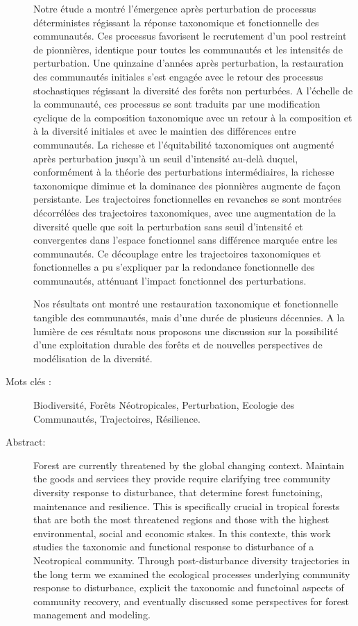 \documentclass[
  11pt,
  french,
  A4paper,
  extrafontsizes,onecolumn,openright
  ]{memoir}
\begin{document}
\begin{normalsize}
\begin{description}
Notre étude a montré l'émergence après perturbation de processus
déterministes régissant la réponse taxonomique et fonctionnelle des
communautés. Ces processus favorisent le recrutement d'un pool restreint
de pionnières, identique pour toutes les communautés et les intensités
de perturbation. Une quinzaine d'années après perturbation, la
restauration des communautés initiales s'est engagée avec le retour des
processus stochastiques régissant la diversité des forêts non
perturbées. A l'échelle de la communauté, ces processus se sont traduits
par une modification cyclique de la composition taxonomique avec un
retour à la composition et à la diversité initiales et avec le maintien
des différences entre communautés. La richesse et l'équitabilité
taxonomiques ont augmenté après perturbation jusqu'à un seuil
d'intensité au-delà duquel, conformément à la théorie des perturbations
intermédiaires, la richesse taxonomique diminue et la dominance des
pionnières augmente de façon persistante. Les trajectoires
fonctionnelles en revanches se sont montrées décorrélées des
trajectoires taxonomiques, avec une augmentation de la diversité quelle
que soit la perturbation sans seuil d'intensité et convergentes dans
l'espace fonctionnel sans différence marquée entre les communautés. Ce
découplage entre les trajectoires taxonomiques et fonctionnelles a pu
s'expliquer par la redondance fonctionnelle des communautés, atténuant
l'impact fonctionnel des perturbations.

Nos résultats ont montré une restauration taxonomique et fonctionnelle
tangible des communautés, mais d'une durée de plusieurs décennies. A la
lumière de ces résultats nous proposons une discussion sur la
possibilité d'une exploitation durable des forêts et de nouvelles
perspectives de modélisation de la diversité.\newline

\item[Mots clés :]
Biodiversité, Forêts Néotropicales, Perturbation, Ecologie des Communautés, Trajectoires, Résilience.
~\\

\item[Abstract:]
Forest are currently threatened by the global changing context. Maintain
the goods and services they provide require clarifying tree community
diversity response to disturbance, that determine forest functoining,
maintenance and resilience. This is specifically crucial in tropical
forests that are both the most threatened regions and those with the
highest environmental, social and economic stakes. In this contexte,
this work studies the taxonomic and functional response to disturbance
of a Neotropical community. Through post-disturbance diversity
trajectories in the long term we examined the ecological processes
underlying community response to disturbance, explicit the taxonomic and
functoinal aspects of community recovery, and eventually discussed some
perspectives for forest management and modeling.\newline


\end{description}
\end{normalsize}
\end{document}
